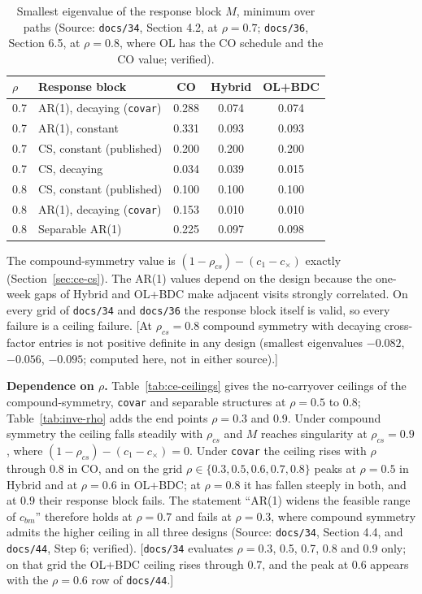 \documentclass[11pt]{article}
\newcommand{\note}[1]{\textcolor{blue!60!black}{\small [#1]}}
\newcommand{\code}[1]{\texttt{#1}}
\begin{document}
\begin{table}[h]
\centering\small
\caption{Smallest eigenvalue of the response block $M$, minimum over
paths (Source: \code{docs/34}, Section 4.2, at $\rho = 0.7$;
\code{docs/36}, Section 6.5, at $\rho = 0.8$, where OL has the CO
schedule and the CO value; verified).}
\label{tab:inve-eig}
\begin{tabular}{@{}llccc@{}}
\toprule
$\rho$ & Response block & CO & Hybrid & OL+BDC \\
\midrule
0.7 & AR(1), decaying (\code{covar}) & 0.288 & 0.074 & 0.074 \\
0.7 & AR(1), constant & 0.331 & 0.093 & 0.093 \\
0.7 & CS, constant (published) & 0.200 & 0.200 & 0.200 \\
0.7 & CS, decaying & 0.034 & 0.039 & 0.015 \\
0.8 & CS, constant (published) & 0.100 & 0.100 & 0.100 \\
0.8 & AR(1), decaying (\code{covar}) & 0.153 & 0.010 & 0.010 \\
0.8 & Separable AR(1) & 0.225 & 0.097 & 0.098 \\
\bottomrule
\end{tabular}
\end{table}

The compound-symmetry value is $(1-\rho_{cs})-(c_1-c_\times)$ exactly
(Section~\ref{sec:ce-cs}). The AR(1) values depend on the design
because the one-week gaps of Hybrid and OL+BDC make adjacent visits
strongly correlated. On every grid of \code{docs/34} and \code{docs/36}
the response block itself is valid, so every failure is a ceiling
failure. \note{At $\rho_{cs} = 0.8$ compound symmetry with decaying
cross-factor entries is not positive definite in any design (smallest
eigenvalues $-0.082$, $-0.056$, $-0.095$; computed here, not in either
source).}

\textbf{Dependence on $\rho$.} Table~\ref{tab:ce-ceilings} gives the
no-carryover ceilings of the compound-symmetry, \code{covar} and
separable structures at $\rho = 0.5$ to 0.8; Table~\ref{tab:inve-rho}
adds the end points $\rho = 0.3$ and 0.9. Under compound symmetry the
ceiling falls steadily with $\rho_{cs}$ and $M$ reaches singularity at
$\rho_{cs} = 0.9$, where $(1-\rho_{cs})-(c_1-c_\times) = 0$. Under \code{covar}
the ceiling rises with $\rho$ through $0.8$ in CO, and on the grid
$\rho \in \{0.3, 0.5, 0.6, 0.7, 0.8\}$ peaks at $\rho = 0.5$ in Hybrid
and at $\rho = 0.6$ in OL+BDC; at $\rho = 0.8$ it has fallen steeply in
both, and at $0.9$ their response block fails. The statement ``AR(1)
widens the feasible range of $c_{bm}$'' therefore holds at
$\rho = 0.7$ and fails at $\rho = 0.3$, where compound symmetry admits
the higher ceiling in all three designs (Source: \code{docs/34},
Section 4.4, and \code{docs/44}, Step 6; verified). \note{\code{docs/34}
evaluates $\rho = 0.3$, 0.5, 0.7, 0.8 and 0.9 only; on that grid the
OL+BDC ceiling rises through 0.7, and the peak at 0.6 appears with the
$\rho = 0.6$ row of \code{docs/44}.}
\end{document}
